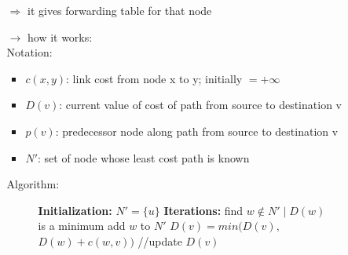 \begin{itemize}
\begin{itemize}
        $\Rightarrow$ it gives forwarding table for that node
        \item[$\rightarrow$] how it works:\\[0.2cm]
        Notation:
        \begin{itemize}
            \item $c(x,y)$: link cost from node x to y; initially $= + \infty$
            \item $D(v)$: current value of cost of path from source to destination v
            \item $p(v)$: predecessor node along path from source to destination v
            \item $N'$: set of node whose least cost path is known
        \end{itemize}
        \newpage
        Algorithm:
        \vspace*{-0.5cm}
        \begin{figure}[!h]
            \centering
            \begin{minipage}{.75\linewidth}
                \begin{algorithm}[H]
                    \captionsetup{labelformat=empty}
                    \begin{algorithmic}[1]
                    \State \textbf{Initialization:}
                    \State $N' = \{u\}$
                        \Else 
                        \EndIf
                    \EndFor
                    \State
                    \State \textbf{Iterations:}
                    \Repeat 
                    \State find $w \notin N' \mid D(w)$ is a minimum
                    \State add $w$ to $N'$
                        \State $D(v) = min(D(v),$ $D(w) + c(w,v))$ //update $D(v)$
                    \EndFor
                    \end{algorithmic}
                \end{algorithm}
            \end{minipage}
        \end{figure}
    \end{itemize}
\end{itemize}

